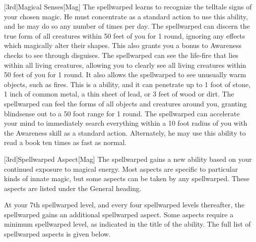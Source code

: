         [3rd]{Magical Senses}[Mag]
        The spellwarped learns to recognize the telltale signs of your chosen magic.
        He must concentrate as a standard action to use this ability, and he may do so any number of times per day.
        The spellwarped can discern the true form of all creatures within 50 feet of you for 1 round, ignoring any effects which magically alter their shapes.
        This also grants you a  bonus to Awareness checks to see through disguises.
        The spellwarped can see the life-fire that lies within all living creatures, allowing you to clearly see all living creatures within 50 feet of you for 1 round.
        It also allows the spellwarped to see unusually warm objects, such as fires.
        This is a  ability, and it can penetrate up to 1 foot of stone, 1 inch of common metal, a thin sheet of lead, or 3 feet of wood or dirt.
        The spellwarped can feel the forms of all objects and creatures around you, granting blindsense out to a 50 foot range for 1 round.
        The spellwarped can accelerate your mind to immediately search everything within a 10 foot radius of you with the Awareness skill as a standard action.
        Alternately, he may use this ability to read a book ten times as fast as normal.

        [3rd]{Spellwarped Aspect}[Mag]
        The spellwarped gains a new ability based on your continued exposure to magical energy.
        Most aspects are specific to particular kinds of innate magic, but some aspects can be taken by any spellwarped.
        These aspects are listed under the General heading.

        At your 7th spellwarped level, and every four spellwarped levels thereafter, the spellwarped gains an additional spellwarped aspect.
        Some aspects require a minimum spellwarped level, as indicated in the title of the ability.
        The full list of spellwarped aspects is given below.


